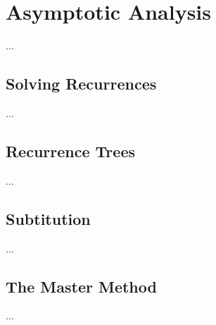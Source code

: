 
\thispagestyle{fancyplain}

\chapter{Asymptotic Analysis}
\label{ch:asymptoticanalysis}
...

\section{Solving Recurrences}
\label{ch:asymptoticanalysis|sec:solvingrecurrences}
...

\section{Recurrence Trees}
\label{ch:asymptoticanalysis|sec:solvingrecurrences|sub:recurrencetrees}
...

\section{Subtitution}
\label{ch:asymptoticanalysis|sec:solvingrecurrences|sub:substitution}
...

\section{The Master Method}
\label{ch:asymptoticanalysis|sec:solvingrecurrences|sub:themastermethod}
...

